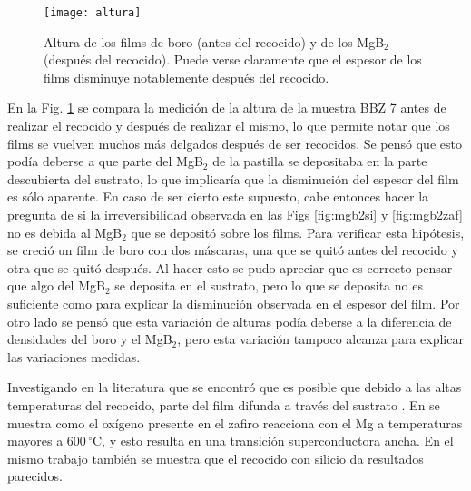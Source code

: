 \begin{figure}[h!]
 \begin{center}
    \texttt{[image: altura]}
  \end{center}
\caption[Altura de los films de boro (antes del recocido) y de los MgB$_2$ (después del recocido).]{Altura de los films de boro (antes del recocido) y de los MgB$_2$ (después del recocido). Puede verse claramente que el espesor de los films disminuye notablemente después del recocido.}
\label{fig:histo2}
\end{figure}
En la Fig. \ref{fig:histo2} se compara la medición de la altura de la muestra BBZ 7 antes de realizar el recocido y después de realizar el mismo, lo que permite notar que los films se vuelven muchos más delgados después de ser recocidos. Se pensó que esto podía deberse a que parte del MgB$_2$ de la pastilla se depositaba en la parte descubierta del sustrato, lo que implicaría que la disminución del espesor del film es sólo aparente. En caso de ser cierto este supuesto, cabe entonces hacer la pregunta de si la irreversibilidad observada en las Figs \ref{fig:mgb2si} y \ref{fig:mgb2zaf} no es debida al MgB$_2$ que se depositó sobre los films. Para verificar esta hipótesis, se creció un film de boro con dos máscaras, una que se quitó antes del recocido y otra que se quitó después. Al hacer esto se pudo apreciar que es correcto pensar que algo del MgB$_2$ se deposita en el sustrato, pero lo que se deposita no es suficiente como para explicar la disminución observada en el espesor del film. Por otro lado se pensó que esta variación de alturas podía deberse a la diferencia de densidades del boro y el MgB$_2$, pero esta variación tampoco alcanza para explicar las variaciones medidas.

Investigando en la literatura que se encontró que es posible que debido a las altas temperaturas del recocido, parte del film difunda a través del sustrato \cite{Zhai1995, Naito2004, He2002}. En \cite{He2002} se muestra como el oxígeno presente en el zafiro reacciona con el Mg a temperaturas mayores a 600\,$^{\circ}$C, y esto resulta en una transición superconductora ancha. En el mismo trabajo también se muestra que el recocido con silicio da resultados parecidos.


